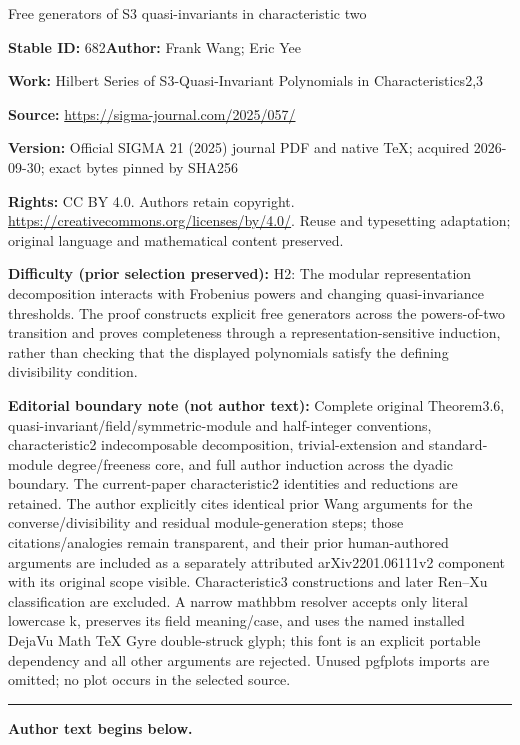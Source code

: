 \documentclass[11pt]{article}
\numberwithin{equation}{section}
\theoremstyle{definition}
\numberwithin{equation}{section}
\begin{document}
\begin{center}\Large Free generators of S3 quasi-invariants in characteristic two\end{center}
\noindent\textbf{Stable ID:} 682\quad\textbf{Author:} Frank Wang; Eric Yee\par
\noindent\textbf{Work:} Hilbert Series of S3-Quasi-Invariant Polynomials in Characteristics2,3\par
\noindent\textbf{Source:} \url{https://sigma-journal.com/2025/057/}\par
\noindent\textbf{Version:} Official SIGMA 21 (2025) journal PDF and native TeX; acquired 2026-09-30; exact bytes pinned by SHA256\par
\noindent\textbf{Rights:} CC BY 4.0. Authors retain copyright. \url{https://creativecommons.org/licenses/by/4.0/}. Reuse and typesetting adaptation; original language and mathematical content preserved.\par
\noindent\textbf{Difficulty (prior selection preserved):} {\CJKfont H2: The modular representation decomposition interacts with Frobenius powers and changing quasi-invariance thresholds. The proof constructs explicit free generators across the powers-of-two transition and proves completeness through a representation-sensitive induction, rather than checking that the displayed polynomials satisfy the defining divisibility condition.}\par
\medskip\noindent\textbf{Editorial boundary note (not author text):} Complete original Theorem3.6, quasi-invariant/field/symmetric-module and half-integer conventions, characteristic2 indecomposable decomposition, trivial-extension and standard-module degree/freeness core, and full author induction across the dyadic boundary. The current-paper characteristic2 identities and reductions are retained. The author explicitly cites identical prior Wang arguments for the converse/divisibility and residual module-generation steps; those citations/analogies remain transparent, and their prior human-authored arguments are included as a separately attributed arXiv2201.06111v2 component with its original scope visible. Characteristic3 constructions and later Ren–Xu classification are excluded. A narrow mathbbm resolver accepts only literal lowercase k, preserves its field meaning/case, and uses the named installed DejaVu Math TeX Gyre double-struck glyph; this font is an explicit portable dependency and all other arguments are rejected. Unused pgfplots imports are omitted; no plot occurs in the selected source.\par
\medskip\hrule\medskip\noindent\textbf{Author text begins below.}\par
\setcounter{section}{1}
\end{document}
